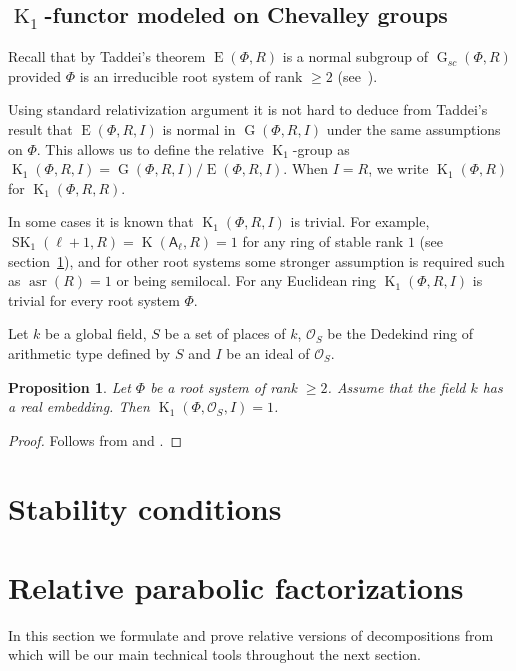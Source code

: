 \documentclass[12pt]{amsart}
\theoremstyle{plain}
\numberwithin{equation}{section}
\numberwithin{lemma}{section}
\newtheorem{prop}[lemma]{Proposition}
\theoremstyle{definition}
\theoremstyle{remark}
\DeclareMathOperator{\K}{K}
\DeclareMathOperator{\SK}{SK}
\DeclareMathOperator{\G}{G}
\DeclareMathOperator{\E}{E}
\DeclareMathOperator{\asr}{asr}
\newcommand{\rA}{\mathsf{A}}
\begin{document}
\subsection{$\K_1$-functor modeled on Chevalley groups}
Recall that by Taddei's theorem $\E(\Phi, R)$ is a normal subgroup of $\G_{sc}(\Phi, R)$ provided $\Phi$ is an irreducible root system of rank $\geqslant 2$ (see~\cite{Ta}).

Using standard relativization argument it is not hard to deduce from Taddei's result that $\E(\Phi, R, I)$ is normal in $\G(\Phi, R, I)$ under the same assumptions on $\Phi$.
This allows us to define the relative $\K_1$-group as $\K_1(\Phi, R, I)=\G(\Phi, R, I)/\E(\Phi, R, I).$
When $I=R$, we write $\K_1(\Phi, R)$ for $\K_1(\Phi, R, R)$.

In some cases it is known that $\K_1(\Phi, R, I)$ is trivial.
For example, $\SK_1(\ell+1, R)=\K(\rA_\ell, R)=1$ for any ring of stable rank $1$ (see section~\ref{sec:stability-conditions}), 
and for other root systems some stronger assumption is required such as $\asr(R)=1$ or being semilocal. 
For any Euclidean ring $\K_1(\Phi, R, I)$ is trivial for every root system $\Phi$.

Let $k$ be a global field, $S$ be a set of places of $k$, 
$\mathcal{O}_S$ be the Dedekind ring of arithmetic type defined by $S$ and $I$ be an ideal of $\mathcal{O}_S$.
\begin{prop} \label{prop:K1triv}
Let $\Phi$ be a root system of rank $\geqslant2$. Assume that the field $k$ has a real embedding. Then $\K_1(\Phi, \mathcal{O}_S, I)=1$.
\end{prop}
\begin{proof} Follows from \cite[Theorem~3.6]{BassMilnorSerre} and \cite[Corollary~4.5]{Ma69}. \end{proof}

\section{Stability conditions}\label{sec:stability-conditions}


\section{Relative parabolic factorizations} \label{sec:factorizations}
In this section we formulate and prove relative versions of decompositions from~\cite{St78} which will be our main technical tools throughout the next section.
\end{document}
